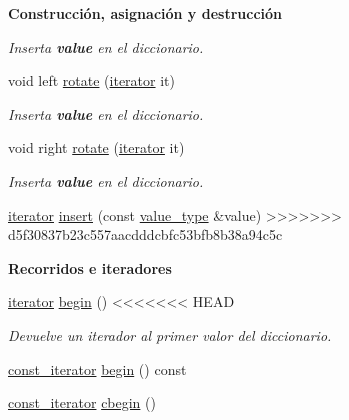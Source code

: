 \begin{Indent}{\bf \-Construcción, asignación y destrucción}
\begin{Indent}
\begin{DoxyCompactItemize}
\begin{DoxyCompactList}\small\item\em Inserta {\bfseries value} en el diccionario. \end{DoxyCompactList}\item 
void left \hyperlink{classaed2_1_1iterator_af4e447a081108196ecdf39b16ecb5303_af4e447a081108196ecdf39b16ecb5303}{rotate} (\hyperlink{classaed2_1_1iterator_1_1iterator}{iterator} it)
\begin{DoxyCompactList}\small\item\em Inserta {\bfseries value} en el diccionario. \end{DoxyCompactList}\item 
void right \hyperlink{classaed2_1_1iterator_a191eae4f3f076914ff1560a2fa833b70_a191eae4f3f076914ff1560a2fa833b70}{rotate} (\hyperlink{classaed2_1_1iterator_1_1iterator}{iterator} it)
\begin{DoxyCompactList}\small\item\em Inserta {\bfseries value} en el diccionario. \end{DoxyCompactList}\item 
\hyperlink{classaed2_1_1iterator_1_1iterator}{iterator} \hyperlink{classaed2_1_1iterator_aa1870e8bfa4f45c82fa1ee076846922b_aa1870e8bfa4f45c82fa1ee076846922b}{insert} (const \hyperlink{classaed2_1_1iterator_a6411a2c08b2b7c52f063bef1a168acb6_a6411a2c08b2b7c52f063bef1a168acb6}{value\+\_\+type} \&value)
>>>>>>> d5f30837b23c557aacdddcbfc53bfb8b38a94c5c
\end{DoxyCompactItemize}
\end{Indent}
\begin{Indent}\textbf{ Recorridos e iteradores}\par
\begin{DoxyCompactItemize}
\item 
\hyperlink{classaed2_1_1iterator_1_1iterator}{iterator} \hyperlink{classaed2_1_1iterator_af8901de173468531c58458b581d345a6_af8901de173468531c58458b581d345a6}{begin} ()
<<<<<<< HEAD
\begin{DoxyCompactList}\small\item\em \-Devuelve un iterador al primer valor del diccionario. \end{DoxyCompactList}\item 
\hyperlink{classaed2_1_1iterator_1_1const__iterator}{const\-\_\-iterator} \hyperlink{classaed2_1_1iterator_a102b6014e02bf9a1ed551f9cdea027d0_a102b6014e02bf9a1ed551f9cdea027d0}{begin} () const 
\item 
\hyperlink{classaed2_1_1iterator_1_1const__iterator}{const\-\_\-iterator} \hyperlink{classaed2_1_1iterator_a89cca73bd2e4df39de7c412c441d6da1_a89cca73bd2e4df39de7c412c441d6da1}{cbegin} ()

\end{DoxyCompactItemize}
\end{Indent}
\end{Indent}
